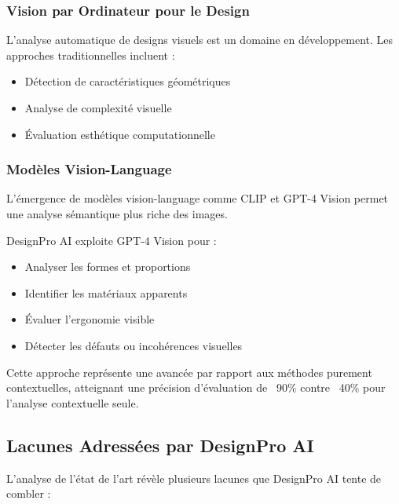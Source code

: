 \subsubsection{Vision par Ordinateur pour le Design}

L'analyse automatique de designs visuels est un domaine en développement. Les approches traditionnelles incluent :
\begin{itemize}[leftmargin=*]
    \item Détection de caractéristiques géométriques
    \item Analyse de complexité visuelle
    \item Évaluation esthétique computationnelle
\end{itemize}

\subsubsection{Modèles Vision-Language}

L'émergence de modèles vision-language comme CLIP \cite{radford2021learning} et GPT-4 Vision \cite{openai2023gpt4v} permet une analyse sémantique plus riche des images.

DesignPro AI exploite GPT-4 Vision pour :
\begin{itemize}[leftmargin=*]
    \item Analyser les formes et proportions
    \item Identifier les matériaux apparents
    \item Évaluer l'ergonomie visible
    \item Détecter les défauts ou incohérences visuelles
\end{itemize}

Cette approche représente une avancée par rapport aux méthodes purement contextuelles, atteignant une précision d'évaluation de ~90\% contre ~40\% pour l'analyse contextuelle seule.

\subsection{Lacunes Adressées par DesignPro AI}

L'analyse de l'état de l'art révèle plusieurs lacunes que DesignPro AI tente de combler :

